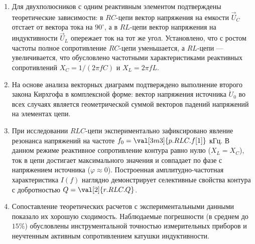 \begin{enumerate}
    \item Для двухполюсников с одним реактивным элементом подтверждены теоретические зависимости: в $RC$-цепи вектор напряжения на емкости $\vec{U}_C$ отстает от вектора тока на $90^{\circ}$, а в $RL$-цепи вектор напряжения на индуктивности $\vec{U}_L$ опережает ток на тот же угол. Установлено, что с ростом частоты полное сопротивление $RC$-цепи уменьшается, а $RL$-цепи — увеличивается, что обусловлено частотными характеристиками реактивных сопротивлений $X_C = 1/(2\pi f C)$ и $X_L = 2\pi f L$.
    \item На основе анализа векторных диаграмм подтверждено выполнение второго закона Кирхгофа в комплексной форме: вектор напряжения источника $\dot{U}_0$ во всех случаях является геометрической суммой векторов падений напряжений на элементах цепи.
    \item При исследовании $RLC$-цепи экспериментально зафиксировано явление резонанса напряжений на частоте $f_0 = \val[3m3]{p.RLC.f[1]}$ кГц. В данном режиме реактивное сопротивление контура равно нулю ($X_L = X_C$), ток в цепи достигает максимального значения и совпадает по фазе с напряжением источника ($\varphi \approx 0$). Построенная амплитудно-частотная характеристика $I(f)$ наглядно демонстрирует селективные свойства контура с добротностью $Q = \val[2]{r.RLC.Q}$.
    \item Сопоставление теоретических расчетов с экспериментальными данными показало их хорошую сходимость. Наблюдаемые погрешности (в среднем до $15\%$) обусловлены инструментальной точностью измерительных приборов и неучтенным активным сопротивлением катушки индуктивности.
\end{enumerate}
